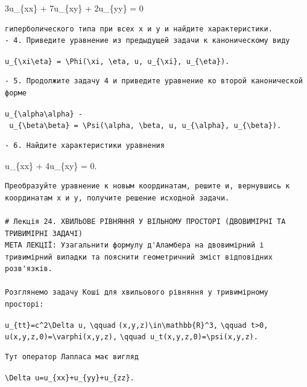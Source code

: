 \documentclass[
  ukrainian,
]{article}
\begin{document}
3u\_\{xx\} + 7u\_\{xy\} + 2u\_\{yy\} = 0

\begin{verbatim}
гиперболического типа при всех x и y и найдите характеристики.
- 4. Приведите уравнение из предыдущей задачи к каноническому виду
\end{verbatim}

\texttt{u\_\{\textbackslash{}xi\textbackslash{}eta\}\ =\ \textbackslash{}Phi(\textbackslash{}xi,\ \textbackslash{}eta,\ u,\ u\_\{\textbackslash{}xi\},\ u\_\{\textbackslash{}eta\}).}

\begin{verbatim}
- 5. Продолжите задачу 4 и приведите уравнение ко второй канонической форме
\end{verbatim}

\texttt{u\_\{\textbackslash{}alpha\textbackslash{}alpha\}\ -\ u\_\{\textbackslash{}beta\textbackslash{}beta\}\ =\ \textbackslash{}Psi(\textbackslash{}alpha,\ \textbackslash{}beta,\ u,\ u\_\{\textbackslash{}alpha\},\ u\_\{\textbackslash{}beta\}).}

\begin{verbatim}
- 6. Найдите характеристики уравнения
\end{verbatim}

u\_\{xx\} + 4u\_\{xy\} = 0.

\begin{verbatim}
Преобразуйте уравнение к новым координатам, решите и, вернувшись к координатам x и y, получите решение исходной задачи.

# Лекція 24. ХВИЛЬОВЕ РІВНЯННЯ У ВІЛЬНОМУ ПРОСТОРІ (ДВОВИМІРНІ ТА ТРИВИМІРНІ ЗАДАЧІ)
МЕТА ЛЕКЦІЇ: Узагальнити формулу д'Аламбера на двовимірний і тривимірний випадки та пояснити геометричний зміст відповідних розв'язків.

Розглянемо задачу Коші для хвильового рівняння у тривимірному просторі:
\end{verbatim}

\texttt{u\_\{tt\}=c\^{}2\textbackslash{}Delta\ u,}
\texttt{\textbackslash{}qquad}
\texttt{(x,y,z)\textbackslash{}in\textbackslash{}mathbb\{R\}\^{}3,}
\texttt{\textbackslash{}qquad\ t\textgreater{}0,}
\texttt{u(x,y,z,0)=\textbackslash{}varphi(x,y,z),}
\texttt{\textbackslash{}qquad\ u\_t(x,y,z,0)=\textbackslash{}psi(x,y,z).}

\begin{verbatim}
Тут оператор Лапласа має вигляд
\end{verbatim}

\texttt{\textbackslash{}Delta\ u=u\_\{xx\}+u\_\{yy\}+u\_\{zz\}.}
\end{document}
